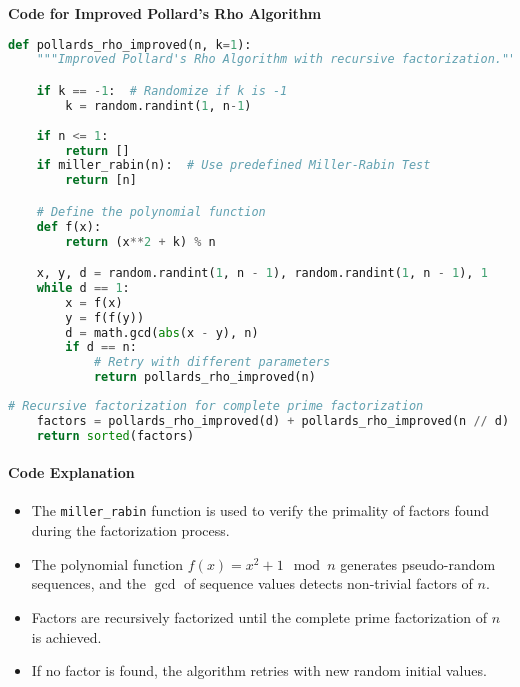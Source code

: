 \documentclass[12pt]{report}
\begin{document}
\begin{center}
    \item \textbf{Code for Improved Pollard's Rho Algorithm}
\end{center}

\begin{lstlisting}[language=Python]
def pollards_rho_improved(n, k=1):
    """Improved Pollard's Rho Algorithm with recursive factorization."""

    if k == -1:  # Randomize if k is -1
        k = random.randint(1, n-1)
    
    if n <= 1:
        return []
    if miller_rabin(n):  # Use predefined Miller-Rabin Test
        return [n]

    # Define the polynomial function
    def f(x):
        return (x**2 + k) % n

    x, y, d = random.randint(1, n - 1), random.randint(1, n - 1), 1
    while d == 1:
        x = f(x)
        y = f(f(y))
        d = math.gcd(abs(x - y), n)
        if d == n:
            # Retry with different parameters
            return pollards_rho_improved(n)
\end{lstlisting}

\clearpage

\begin{lstlisting}[language=Python]
    # Recursive factorization for complete prime factorization
    factors = pollards_rho_improved(d) + pollards_rho_improved(n // d)
    return sorted(factors)
\end{lstlisting}

\paragraph{Code Explanation}
\begin{itemize}
    \item The \texttt{miller\_rabin} function is used to verify the primality of factors found during the factorization process.
    \item The polynomial function $f(x) = x^2 + 1 \mod n$ generates pseudo-random sequences, and the $\gcd$ of sequence values detects non-trivial factors of $n$.
    \item Factors are recursively factorized until the complete prime factorization of $n$ is achieved.
    \item If no factor is found, the algorithm retries with new random initial values.
\end{itemize}
\end{document}
